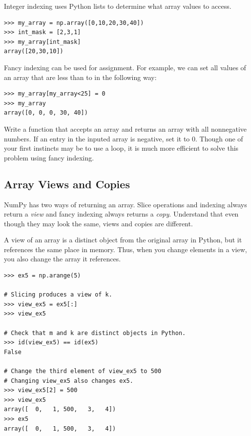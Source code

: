 Integer indexing uses Python lists to determine what array values to access.
\begin{lstlisting}
>>> my_array = np.array([0,10,20,30,40])
>>> int_mask = [2,3,1]
>>> my_array[int_mask]
array([20,30,10])
\end{lstlisting}

Fancy indexing can
be used for assignment. For example, we can set all values of an array
that are less than  to  in the following way:
\begin{lstlisting} 
>>> my_array[my_array<25] = 0
>>> my_array
array([0, 0, 0, 30, 40])
\end{lstlisting}

\begin{problem}
Write a function that accepts an array and returns an array with all nonnegative numbers. If an entry in the inputed array is negative, set it to $0$. Though one of your first instincts may be to use a  loop, it is much more efficient to solve this problem using fancy indexing.
\end{problem}

\subsection*{Array Views and Copies} 
NumPy has two ways of returning an array. Slice operations and indexing always return
a \emph{view} and fancy indexing always returns a \emph{copy}.
Understand that even though they may look the same, views and copies are different.


A view of an array is a distinct object from the original array in Python, but it references the same place in memory. 
Thus, when you change elements in a view, you also change the array it references.
\begin{lstlisting}
>>> ex5 = np.arange(5)

# Slicing produces a view of k. 
>>> view_ex5 = ex5[:]
>>> view_ex5

# Check that m and k are distinct objects in Python.
>>> id(view_ex5) == id(ex5) 
False

# Change the third element of view_ex5 to 500
# Changing view_ex5 also changes ex5.
>>> view_ex5[2] = 500 
>>> view_ex5
array([  0,   1, 500,   3,   4])
>>> ex5 
array([  0,   1, 500,   3,   4])
\end{lstlisting} 

